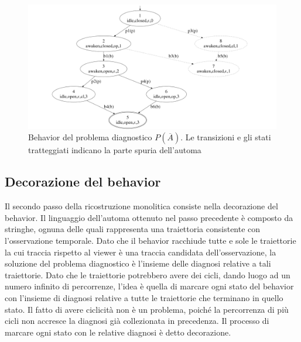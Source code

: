 \begin{figure}[htbp]
\centering
\includegraphics[scale=0.19]{./Img/sa/bhv_s.png}
\caption{Behavior del problema diagnostico $P(\overline{A})$. Le transizioni e gli stati tratteggiati indicano la parte spuria dell'automa}
\label{fig:bhv}
\end{figure}

\subsection{Decorazione del behavior}
Il secondo passo della ricostruzione monolitica consiste nella decorazione del behavior. Il linguaggio dell'automa ottenuto nel passo precedente è composto da stringhe, ognuna delle quali rappresenta una traiettoria consistente con l'osservazione temporale. Dato che il behavior racchiude tutte e sole le traiettorie la cui traccia rispetto al viewer è una traccia candidata dell'osservazione, la soluzione del problema diagnostico è l'insieme delle diagnosi relative a tali traiettorie. Dato che le traiettorie potrebbero avere dei cicli, dando luogo ad un numero infinito di percorrenze, l'idea è quella di marcare ogni stato del behavior con l'insieme di diagnosi relative a tutte le traiettorie che terminano in quello stato. Il fatto di avere ciclicità non è un problema, poiché la percorrenza di più cicli non accresce la diagnosi già collezionata in precedenza. Il processo di marcare ogni stato con le relative diagnosi è detto decorazione.

